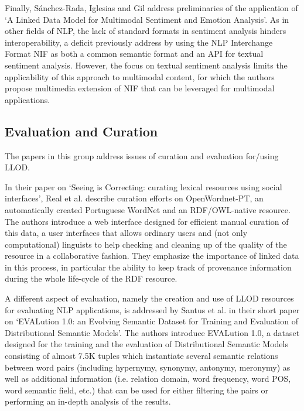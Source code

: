Finally, S\'{a}nchez-Rada, Iglesias and Gil address preliminaries of the application of `A Linked Data Model for Multimodal Sentiment and Emotion Analysis'.
As in other fields of NLP, the lack of standard formats in sentiment analysis hinders interoperability, a deficit previously address by using the NLP Interchange Format NIF as both a common semantic format and an API for textual sentiment analysis. However, the focus on textual sentiment analysis limits the applicability of this approach to multimodal content, for which the authors propose multimedia extension of NIF that can be leveraged for multimodal applications. 

\subsection{Evaluation and Curation}

The papers in this group address issues of curation and evaluation for/using LLOD.

In their paper on `Seeing is Correcting: curating lexical resources using social interfaces', Real et al. describe curation efforts on OpenWordnet-PT, an automatically created Portuguese WordNet and an RDF/OWL-native resource. 
The authors introduce a web interface designed for efficient manual curation of this data, a user interfaces that allows ordinary users and (not only computational) linguists to help checking and cleaning up of the quality of the resource in a collaborative fashion. They emphasize the importance of linked data in this process, in particular the ability to keep track of provenance information during the whole life-cycle of the RDF resource.

A different aspect of evaluation, namely the creation and use of LLOD resources for evaluating NLP applications, is addressed by Santus et al. in their short paper on `EVALution 1.0: an Evolving Semantic Dataset for Training and Evaluation of Distributional Semantic Models'. 
The authors introduce EVALution 1.0, a dataset designed for the training and the evaluation of Distributional Semantic Models consisting of almost 7.5K tuples which instantiate several semantic relations between word pairs (including hypernymy, synonymy, antonymy, meronymy) as well as additional information (i.e. relation domain, word frequency, word POS, word semantic field, etc.) that can be used for either filtering the pairs or performing an in-depth analysis of the results. 

